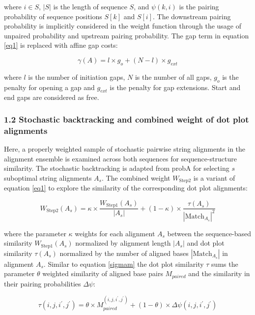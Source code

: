 \documentclass{bmcart}
\begin{document}
\noindent where $i \in S$, $|S|$ is the length of sequence $S$, and $\psi(k,i)$ is the
pairing probability of sequence positions $S[k]$ and $S[i]$. The downstream
pairing probability is implicitly considered in the weight function through the
usage of unpaired probability and upstream pairing probability. The gap term
in equation \ref{eq1} is replaced with affine gap costs:

\begin{equation}\label{eq6}
	\gamma(A) = l \times g_o + (N-l) \times g_{ext}
\end{equation}
	
\noindent where $l$ is the number of initiation gaps, $N$ is the number of all gaps,
$g_o$ is the penalty for opening a gap and $g_{ext}$ is the penalty for gap
extensions. Start and end gaps are considered as free.\\

\subsubsection*{1.2 Stochastic backtracking and combined weight of dot plot alignments}

Here, a properly weighted sample of stochastic pairwise string alignments
in the alignment ensemble is examined across both sequences for sequence-structure similarity.
The stochastic backtracking is adapted from probA \cite{Muckstein12385998} for
selecting $s$ suboptimal string alignments $A_s$.  The combined weight
$W_{\mbox{Step2}}$ is a variant of equation \ref{eq1} to explore the similarity
of the corresponding dot plot alignments:

\begin{equation}\label{eq7}
	W_{\mbox{Step2}}(A_s) = \kappa \times \frac{W_{\mbox{Step1}}(A_s)}{|A_s|} + (1-\kappa) \times
	\frac{\tau(A_s)}{{|\mbox{Match}_{A_s}|}^2}
\end{equation}

\noindent where the parameter $\kappa$ weights for each alignment $A_s$ between the
sequence-based similarity $W_{\mbox{Step1}}(A_s)$ normalized by alignment
length $|A_s|$ and dot plot similarity $\tau(A_s)$ normalized by the number of
aligned bases $|\mbox{Match}_{A_s}|$ in alignment $A_s$. Similar to equation
\ref{sigmam} the dot plot similarity $\tau$ sums the parameter $\theta$ weighted
similarity of aligned base pairs $M_{paired}$ and the similarity in their
pairing probabilities $\Delta \psi$:

\begin{equation}\label{eq8}
	\tau(i,j,i^\prime,j^\prime) = \theta \times M_{paired}^{(i,j,i^\prime,j^\prime)}
	+ (1-\theta) \times \Delta \psi(i,j,i^\prime,j^\prime)
\end{equation}
\end{document}
